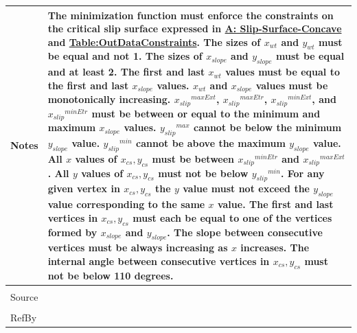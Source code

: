 \documentclass[12pt]{article}
\begin{document}
\begin{minipage}{\textwidth}
\begin{tabular}{p{} p{}}
                                                                                           Notes & The minimization function must enforce the constraints on the critical slip surface expressed in \hyperref[assumpSSC]{A: Slip-Surface-Concave} and \hyperref[Table:OutDataConstraints]{Table:OutDataConstraints}. The sizes of ${x_{wt}}$ and ${y_{wt}}$ must be equal and not 1. The sizes of ${x_{slope}}$ and ${y_{slope}}$ must be equal and at least 2. The first and last ${x_{wt}}$ values must be equal to the first and last ${x_{slope}}$ values. ${x_{wt}}$ and ${x_{slope}}$ values must be monotonically increasing. ${{x_{slip}}^{maxExt}}$, ${{x_{slip}}^{maxEtr}}$, ${{x_{slip}}^{minExt}}$, and ${{x_{slip}}^{minEtr}}$ must be between or equal to the minimum and maximum ${x_{slope}}$ values. ${{y_{slip}}^{max}}$ cannot be below the minimum ${y_{slope}}$ value. ${{y_{slip}}^{min}}$ cannot be above the maximum ${y_{slope}}$ value. All $x$ values of ${x_{cs}},{y_{cs}}$ must be between ${{x_{slip}}^{minEtr}}$ and ${{x_{slip}}^{maxExt}}$. All $y$ values of ${x_{cs}},{y_{cs}}$ must not be below ${{y_{slip}}^{min}}$. For any given vertex in ${x_{cs}},{y_{cs}}$ the $y$ value must not exceed the ${y_{slope}}$ value corresponding to the same $x$ value. The first and last vertices in ${x_{cs}},{y_{cs}}$ must each be equal to one of the vertices formed by ${x_{slope}}$ and ${y_{slope}}$. The slope between consecutive vertices must be always increasing as $x$ increases. The internal angle between consecutive vertices in ${x_{cs}},{y_{cs}}$ must not be below 110 degrees.
                                                                                                   \\ \midrule \\
                                                                                                   Source & \cite{li2010}
                                                                                                            \\ \midrule \\
                                                                                                            RefBy & 
\\ \bottomrule \end{tabular}
\end{minipage}
\end{document}
